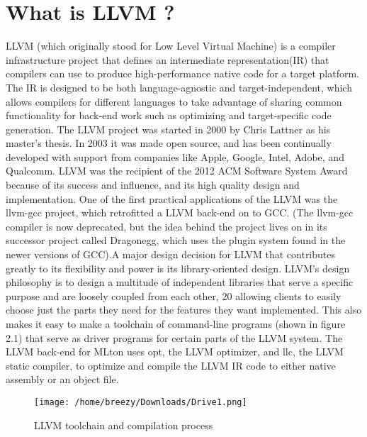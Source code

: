 \documentclass[openany]{book}
\begin{document}
	\section{What is LLVM ?}
	LLVM (which originally stood for Low Level Virtual Machine) is a compiler infrastructure project that defines an intermediate representation(IR) that compilers can use to produce high-performance native code for a target platform. The IR is designed to be both language-agnostic and target-independent, which allows compilers for different languages to take advantage of sharing common functionality for back-end work such as optimizing and target-specific code generation. The LLVM project was started in 2000 by Chris Lattner as his master's thesis. In 2003 it was made open source, and has been continually developed with support from companies like Apple, Google, Intel, Adobe, and Qualcomm. LLVM was the recipient of the 2012 ACM Software System Award because of its success and influence, and its high quality design and implementation. One of the first practical applications of the LLVM was the llvm-gcc project, which retrofitted a LLVM back-end on to GCC. (The llvm-gcc compiler is now deprecated, but the idea behind the project lives on in its successor project called Dragonegg, which uses the plugin system found in the newer versions of GCC).\linebreak \linebreak A major design decision for LLVM that contributes greatly to its flexibility and power is its library-oriented design.  LLVM’s design philosophy is to design a multitude of independent libraries that serve a specific purpose and are loosely coupled from each other, 20 allowing clients to easily choose just the parts they need for the features they want implemented. This also makes it easy to make a toolchain of command-line programs (shown in	figure 2.1) that serve as driver programs for certain parts of the LLVM system. The LLVM back-end for MLton uses opt, the LLVM optimizer, and llc, the LLVM static compiler, to optimize and compile the LLVM IR code to either native assembly or an object file.
	
	\begin{figure}
		\texttt{[image: /home/breezy/Downloads/Drive1.png]}
		\caption{LLVM toolchain and compilation process}
		\label{fig:2.1}
	\end{figure}
	
\end{document}
